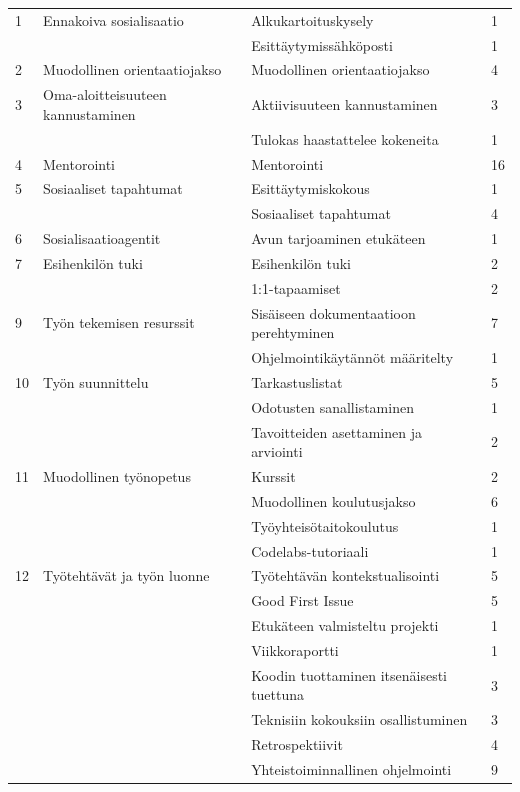 \documentclass[utf8]{gradu3}
\begin{document}
\begin{scriptsize}
\begin{longtable}[c]{llll}
    1 & Ennakoiva sosialisaatio & Alkukartoituskysely & 1 \\
    & & Esittäytymissähköposti & 1 \\
    \hline
    2 & Muodollinen orientaatiojakso & Muodollinen orientaatiojakso & 4\\
    \hline
    3 & Oma-aloitteisuuteen kannustaminen & Aktiivisuuteen kannustaminen & 3 \\
    & & Tulokas haastattelee kokeneita & 1 \\
    \hline
    4 & Mentorointi & Mentorointi & 16 \\
    \hline
    5 & Sosiaaliset tapahtumat & Esittäytymiskokous & 1 \\
    & & Sosiaaliset tapahtumat & 4\\
    \hline
    6 & Sosialisaatioagentit & Avun tarjoaminen etukäteen & 1 \\
    \hline
    7 & Esihenkilön tuki & Esihenkilön tuki & 2 \\
    & & 1:1-tapaamiset & 2 \\
    \hline
    9 & Työn tekemisen resurssit & Sisäiseen dokumentaatioon perehtyminen & 7 \\
    & & Ohjelmointikäytännöt määritelty & 1 \\
    \hline
    10 & Työn suunnittelu & Tarkastuslistat & 5\\
    & & Odotusten sanallistaminen & 1 \\
    & & Tavoitteiden asettaminen ja arviointi & 2\\
    \hline
    11 & Muodollinen työnopetus & Kurssit & 2 \\
    & & Muodollinen koulutusjakso & 6 \\
    & & Työyhteisötaitokoulutus & 1\\
    & & Codelabs-tutoriaali & 1\\
    \hline
    12 & Työtehtävät ja työn luonne & Työtehtävän kontekstualisointi & 5 \\
    & & Good First Issue & 5 \\
    & & Etukäteen valmisteltu projekti & 1 \\
    & & Viikkoraportti & 1 \\
    & & Koodin tuottaminen itsenäisesti tuettuna & 3\\
    & & Teknisiin kokouksiin osallistuminen & 3\\
    & & Retrospektiivit & 4\\
    & & Yhteistoiminnallinen ohjelmointi & 9\\

\end{longtable}
\end{scriptsize}
\end{document}
